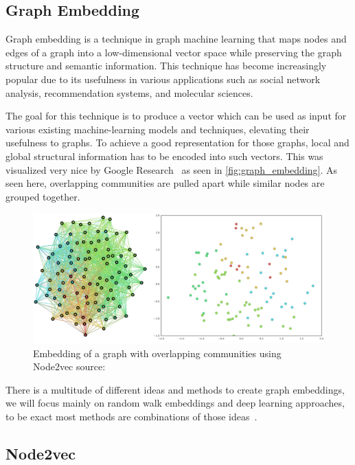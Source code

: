 \subsection{Graph Embedding}
Graph embedding is a technique in graph machine learning that maps nodes and edges of a graph into a low-dimensional vector space while preserving the graph structure and semantic information. This technique has become increasingly popular due to its usefulness in various applications such as social network analysis, recommendation systems, and molecular sciences.

The goal for this technique is to produce a vector which can be used as input for various existing machine-learning models and techniques, elevating their usefulness to graphs. To achieve a good representation for those graphs, local and global structural information has to be encoded into such vectors. This was visualized very nice by Google Research~\cite{epasto2019embedding} as seen in \autoref{fig:graph_embedding}. As seen here, overlapping communities are pulled apart while similar nodes are grouped together.

\begin{figure}[ht!]
    \centering
    \includegraphics[scale=0.35]{tex/res/graph_embedding.png}
    \caption{Embedding of a graph with overlapping communities using Node2vec \tiny{source: \cite{epasto2019embedding}}}
    \label{fig:graph_embedding}
\end{figure}

There is a multitude of different ideas and methods to create graph embeddings, we will focus mainly on random walk embeddings and deep learning approaches, to be exact most methods are combinations of those ideas~\cite{2017graph2vec,2016node2vec,2021graphormer}.
\subsection{Node2vec}

